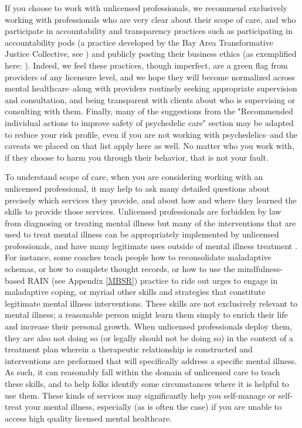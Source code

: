 \documentclass[12pt,letterpaper]{book}
\begin{document}
If you choose to work with unlicensed professionals, we recommend exclusively working with professionals who are very clear about their scope of care, and who participate in accountability and transparency practices such as participating in accountability pods (a practice developed by the Bay Area Transformative Justice Collective, see \textcite{podmapping}) and publicly posting their business ethics (as exemplified here: \textcite{sinbackValues}). Indeed, we feel these practices, though imperfect, are a green flag from providers of any licensure level, and we hope they will become normalized across mental healthcare--along with providers routinely seeking appropriate supervision and consultation, and being transparent with clients about who is supervising or consulting with them. Finally, many of the suggestions from the "Recommended individual actions to improve safety of psychedelic care" section may be adapted to reduce your risk profile, even if you are not working with psychedelics--and the caveats we placed on that list apply here as well. No matter who you work with, if they choose to harm you through their behavior, that is not your fault. 

To understand scope of care, when you are considering working with an unlicensed professional, it may help to ask many detailed questions about precisely which services they provide, and about how and where they learned the skills to provide those services. Unlicensed professionals are forbidden by law from diagnosing or treating mental illness but many of the interventions that are used to treat mental illness can be appropriately implemented by unlicensed professionals, and have many legitimate uses outside of mental illness treatment \cite{aboujaoude2020coachingVSTherapy,healthyGamerCoaching}. For instance, some coaches teach people how to reconsolidate maladaptive schemas, or how to complete thought records, or how to use the mindfulness-based RAIN (see Appendix \ref{MBSR}) practice to ride out urges to engage in maladaptive coping, or myriad other skills and strategies that constitute legitimate mental illness interventions. These skills are not exclusively relevant to mental illness; a reasonable person might learn them simply to enrich their life and increase their personal growth. When unlicensed professionals deploy them, they are also not doing so (or legally should not be doing so) in the context of a treatment plan wherein a therapeutic relationship is constructed and interventions are preformed that will specifically address a specific mental illness. As such, it can reasonably fall within the domain of unlicensed care to teach these skills, and to help folks identify some circumstances where it is helpful to use them. These kinds of services may significantly help you self-manage or self-treat your mental illness, especially (as is often the case) if you are unable to access high quality licensed mental healthcare.
\end{document}
